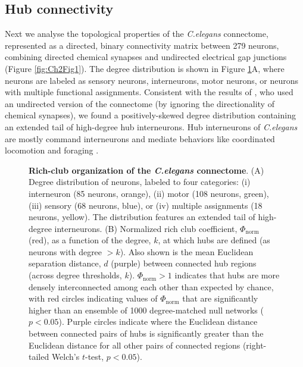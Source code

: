 \subsection{Hub connectivity}

Next we analyse the topological properties of the \emph{C.elegans} connectome, represented as a directed, binary connectivity matrix between 279 neurons, combining directed chemical synapses and undirected electrical gap junctions (Figure \ref{fig:Ch2Fig1}).
The degree distribution is shown in Figure \ref{fig:Ch2Fig5}A, where neurons are labeled as sensory neurons, interneurons, motor neurons, or neurons with multiple functional assignments.
Consistent with the results of \citet{Towlson2013},  who used an undirected version of the connectome (by ignoring the directionality of chemical synapses), we found a positively-skewed degree distribution containing an extended tail of high-degree hub interneurons.
Hub interneurons of \emph{C.elegans} are mostly command interneurons and mediate behaviors like coordinated locomotion and foraging \citep{Tsalik2003}.


\begin{figure}[!h]
 \caption{\textbf{Rich-club organization of the \emph{C.elegans} connectome}.
(A) Degree distribution of neurons, labeled to four categories:
(i) interneuron (85 neurons, orange),
(ii) motor (108 neurons, green),
(iii) sensory (68 neurons, blue), or
(iv) multiple assignments (18 neurons, yellow).
The distribution features an extended tail of high-degree interneurons.
(B)
Normalized rich club coefficient, $\Phi_\mathrm{norm}$ (red), as a function of the degree, $k$, at which hubs are defined (as neurons with degree $>k$).
Also shown is the mean Euclidean separation distance, $d$ (purple) between connected hub regions (across degree thresholds, $k$).
$\Phi_\mathrm{norm} > 1$ indicates that hubs are more densely interconnected among each other than expected by chance, with red circles indicating values of $\Phi_\mathrm{norm}$ that are significantly higher than an ensemble of 1000 degree-matched null networks ($p < 0.05$).
Purple circles indicate where the Euclidean distance between connected pairs of hubs is significantly greater than the Euclidean distance for all other pairs of connected regions (right-tailed Welch's $t$-test, $p < 0.05$).
}
 \label{fig:Ch2Fig5}
\end{figure}

